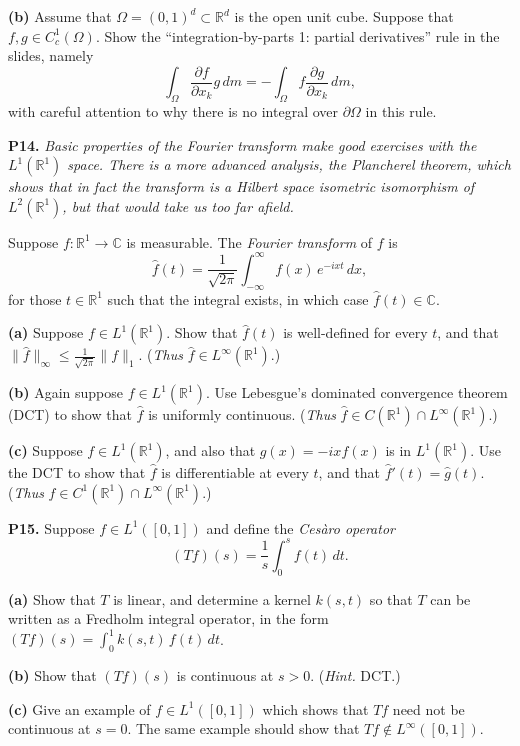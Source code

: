 \documentclass[12pt]{amsart}
\newcommand{\CC}{\mathbb{C}}
\newcommand{\RR}{\mathbb{R}}
\newcommand{\prob}[1]{\bigskip\noindent\textbf{#1.}\quad }
\newcommand{\epart}[1]{\medskip\noindent\textbf{(#1)}\quad }
\begin{document}
\epart{b} Assume that $\Omega = (0,1)^d \subset \RR^d$ is the open unit cube.  Suppose that $f,g\in C_c^1(\Omega)$.  Show the ``integration-by-parts 1: partial derivatives'' rule in the slides, namely
    $$\int_\Omega \frac{\partial f}{\partial x_k} g\,dm = -\int_\Omega f \frac{\partial g}{\partial x_k}\,dm,$$
with careful attention to why there is no integral over $\partial \Omega$ in this rule.


\prob{P14}  \emph{Basic properties of the Fourier transform make good exercises with the $L^1(\RR^1)$ space.  There is a more advanced analysis, the Plancherel theorem, which shows that in fact the transform is a Hilbert space isometric isomorphism of $L^2(\RR^1)$, but that would take us too far afield.}

\medskip \noindent Suppose $f:\RR^1\to\CC$ is measurable.  The \emph{Fourier transform} of $f$ is
\begin{equation}
\hat f(t) = \frac{1}{\sqrt{2\pi}} \int_{-\infty}^\infty f(x) \, e^{-ixt} \, dx, \label{ft}
\end{equation}
for those $t\in\RR^1$ such that the integral exists, in which case $\hat f(t)\in\CC$.

\epart{a} Suppose $f\in L^1(\RR^1)$.  Show that $\hat f(t)$ is well-defined for every $t$, and that $\|\hat f\|_\infty \le \frac{1}{\sqrt{2\pi}} \|f\|_1$.  (\emph{Thus} $\hat f\in L^\infty(\RR^1)$.)

\epart{b} Again suppose $f\in L^1(\RR^1)$.  Use Lebesgue's dominated convergence theorem (DCT) to show that $\hat f$ is uniformly continuous.  (\emph{Thus} $\hat f\in C(\RR^1)\cap L^\infty(\RR^1)$.)

\epart{c} Suppose $f\in L^1(\RR^1)$, and also that $g(x)=-ixf(x)$ is in $L^1(\RR^1)$.  Use the DCT to show that $\hat f$ is differentiable at every $t$, and that $\hat f'(t) = \hat g(t)$.  (\emph{Thus} $\hat f\in C^1(\RR^1)\cap L^\infty(\RR^1)$.)


\prob{P15}  Suppose $f\in L^1([0,1])$ and define the \emph{Ces\`aro operator}
	$$(Tf)(s) = \frac{1}{s} \int_0^s f(t)\,dt.$$

\epart{a}  Show that $T$ is linear, and determine a kernel $k(s,t)$ so that $T$ can be written as a Fredholm integral operator, in the form $(Tf)(s) = \int_0^1 k(s,t)\,f(t)\,dt$.

\epart{b}  Show that $(Tf)(s)$ is continuous at $s>0$.  (\emph{Hint.}  DCT.)

\epart{c}  Give an example of $f\in L^1([0,1])$ which shows that $Tf$ need not be continuous at $s=0$.  The same example should show that $Tf\notin L^\infty([0,1])$.
\end{document}
